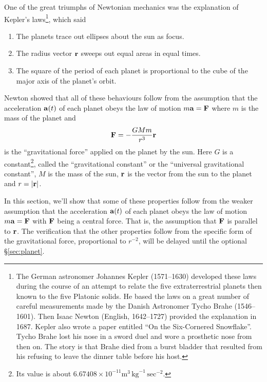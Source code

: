 One of the great triumphs of Newtonian mechanics was the explanation
of Kepler's laws\footnote{The German astronomer Johannes Kepler (1571--1630) 
developed these laws during the course of an attempt to relate the five extraterrestrial planets then known to the five Platonic solids. He based
the laws on a great number of careful measurements 
made by the Danish Astronomer Tycho Brahe (1546--1601). Then
Isaac Newton (English, 1642--1727) provided the explanation in 1687.
Kepler also wrote a paper entitled ``On the Six-Cornered Snowflake''.
Tycho Brahe lost his nose in a sword duel and wore a prosthetic nose
from then on. 
The story is that Brahe died from a burst bladder that resulted 
from his refusing to leave the dinner table before his host.}, 
which said
\begin{enumerate}\itemsep1pt \parskip0pt  %
\item 
The planets trace out ellipses about the sun as focus.
\item
The radius vector $\mathbf{r}$ sweeps out equal areas in equal times. 
\item
The square of the period of each planet is proportional to the cube of the major axis of the planet's orbit.
\end{enumerate}
Newton showed that all of these behaviours follow from the assumption
that the acceleration $\mathbf{a}(t)$ of each planet  obeys the law of
motion $m\mathbf{a} =\mathbf{F}$ where $m$ is the mass of the planet and 
\begin{equation*}
\mathbf{F} = -\frac{GMm}{r^3}\mathbf{r}
\end{equation*}
is the ``gravitational force'' applied on the planet by the sun. Here
$G$ is a constant\footnote{Its value is about $6.67408\times10^{-11} \text{m}^3\,\text{kg}^{-1}\,\text{sec}^{-2}$.}, 
called the ``gravitational constant'' or the
``universal gravitational constant'', $M$ is the mass of the 
sun, $\mathbf{r}$ is the vector from the sun to the planet and $r=|\mathbf{r}|$. 

In this section, we'll show that some of these properties follow from the
weaker assumption that the acceleration $\mathbf{a}(t)$ of each planet 
obeys the law of motion $m\mathbf{a} =\mathbf{F}$ with $\mathbf{F}$ being a central force.
That is, the assumption that $\mathbf{F}$ is parallel to $\mathbf{r}$. The verification that 
the other properties follow from the specific form of the gravitational 
force, proportional to $r^{-2}$, will be delayed until the 
optional \S\ref{sec:planet}. 

